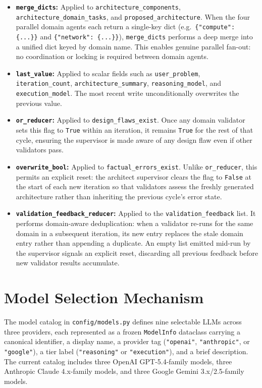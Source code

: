 \begin{itemize}
    \item \textbf{\texttt{merge\_dicts}:} Applied to \texttt{architecture\_components}, \texttt{architecture\_domain\_tasks}, and \texttt{proposed\_architecture}. When the four parallel domain agents each return a single-key dict (e.g.\ \texttt{\{"compute": \{...\}\}} and \texttt{\{"network": \{...\}\}}), \texttt{merge\_dicts} performs a deep merge into a unified dict keyed by domain name. This enables genuine parallel fan-out: no coordination or locking is required between domain agents.
    \item \textbf{\texttt{last\_value}:} Applied to scalar fields such as \texttt{user\_problem}, \texttt{iteration\_count}, \texttt{architecture\_summary}, \texttt{reasoning\_model}, and \texttt{execution\_model}. The most recent write unconditionally overwrites the previous value.
    \item \textbf{\texttt{or\_reducer}:} Applied to \texttt{design\_flaws\_exist}. Once any domain validator sets this flag to \texttt{True} within an iteration, it remains \texttt{True} for the rest of that cycle, ensuring the supervisor is made aware of any design flaw even if other validators pass.
    \item \textbf{\texttt{overwrite\_bool}:} Applied to \texttt{factual\_errors\_exist}. Unlike \texttt{or\_reducer}, this permits an explicit reset: the architect supervisor clears the flag to \texttt{False} at the start of each new iteration so that validators assess the freshly generated architecture rather than inheriting the previous cycle's error state.
    \item \textbf{\texttt{validation\_feedback\_reducer}:} Applied to the \texttt{validation\_feedback} list. It performs domain-aware deduplication: when a validator re-runs for the same domain in a subsequent iteration, its new entry replaces the stale domain entry rather than appending a duplicate. An empty list emitted mid-run by the supervisor signals an explicit reset, discarding all previous feedback before new validator results accumulate.
\end{itemize}

\section{Model Selection Mechanism}

The model catalog in \texttt{config/models.py} defines nine selectable LLMs across three providers, each represented as a frozen \texttt{ModelInfo} dataclass carrying a canonical identifier, a display name, a provider tag (\texttt{"openai"}, \texttt{"anthropic"}, or \texttt{"google"}), a tier label (\texttt{"reasoning"} or \texttt{"execution"}), and a brief description. The current catalog includes three OpenAI GPT-5.4-family models, three Anthropic Claude 4.x-family models, and three Google Gemini 3.x/2.5-family models.

